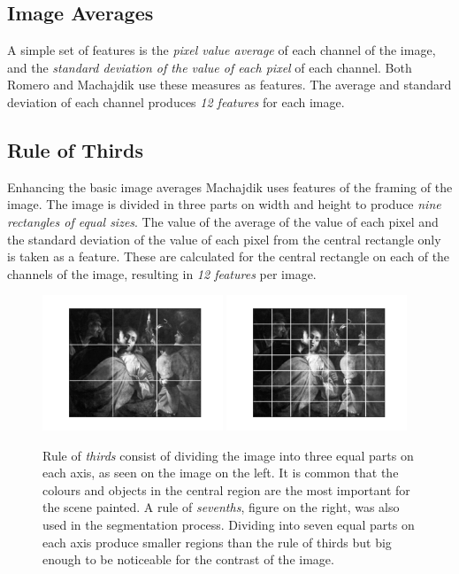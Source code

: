 \documentclass[11pt,a4paper,twoside,openright]{report}
\begin{document}
\subsection{Image Averages}

A simple set of features is the \emph{pixel value average} of each channel of
the image, and the \emph{standard deviation of the value of each pixel} of each
channel.  Both Romero \cite{jma12clas} and Machajdik \cite{mach10clas} use
these measures as features.  The average and standard deviation of each channel
produces \emph{12 features} for each image.

\subsection{Rule of Thirds}

Enhancing the basic image averages Machajdik \cite{mach10clas} uses features of
the framing of the image.  The image is divided in three parts on width and
height to produce \emph{nine rectangles of equal sizes}.  The value of the
average of the value of each pixel and the standard deviation of the value of
each pixel from the central rectangle only is taken as a feature.  These are
calculated for the central rectangle on each of the channels of the image,
resulting in \emph{12 features} per image.

\begin{figure}[tbp]
\centering
\includegraphics[width=0.48\textwidth]{r3_L_caravaggio_1962_139_1}
\includegraphics[width=0.48\textwidth]{r7_L_caravaggio_1962_139_1}
\caption[Rule of thirds]{Rule of \emph{thirds} consist of dividing the image
into three equal parts on each axis, as seen on the image on the left.  It is
common that the colours and objects in the central region are the most
important for the scene painted.  A rule of \emph{sevenths}, figure on the
right, was also used in the segmentation process.  Dividing into seven equal
parts on each axis produce smaller regions than the rule of thirds but big
enough to be noticeable for the contrast of the image.}
\label{fig:r3}
\end{figure}
\end{document}

